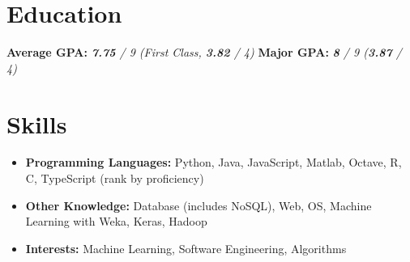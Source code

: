 \documentclass{resume}
\begin{document}




\section{Education}
\textbf{Average GPA:} \textit{\textbf{7.75} / 9 (First Class, \textbf{3.82} / 4)} \hspace{0.6cm} \textbf{Major GPA:} \textit{\textbf{8} / 9 (\textbf{3.87} / 4)}

\section{Skills}
\begin{itemize}[parsep=0.5ex]
  \item \textbf{Programming Languages:} Python, Java, JavaScript, Matlab, Octave, R, C, TypeScript (rank by proficiency)
  \item \textbf{Other Knowledge:} Database (includes NoSQL), Web, OS, Machine Learning with Weka, Keras, Hadoop
  \item \textbf{Interests:} Machine Learning, Software Engineering, Algorithms
\end{itemize}
\end{document}
